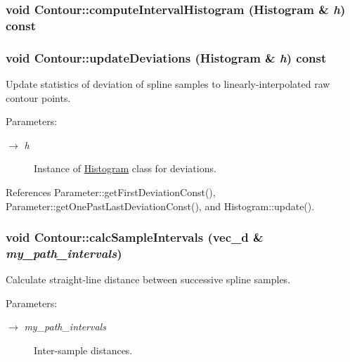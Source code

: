 \hypertarget{classContour_b6aef0a09131e1ed47a64378373a4571}{
\subsubsection[computeIntervalHistogram]{\setlength{\rightskip}{0pt plus 5cm}void Contour::computeIntervalHistogram ({\bf Histogram} \& {\em h}) const}}
\label{classContour_b6aef0a09131e1ed47a64378373a4571}


\hypertarget{classContour_bfbd206df1ad7a511a0144ae866d2432}{
\subsubsection[updateDeviations]{\setlength{\rightskip}{0pt plus 5cm}void Contour::updateDeviations ({\bf Histogram} \& {\em h}) const}}
\label{classContour_bfbd206df1ad7a511a0144ae866d2432}


Update statistics of deviation of spline samples to linearly-interpolated raw contour points. \begin{Desc}
\item[Parameters:]
\begin{description}
\item[\mbox{$\rightarrow$} {\em h}]Instance of \hyperlink{classHistogram}{Histogram} class for deviations. \end{description}
\end{Desc}


References Parameter::getFirstDeviationConst(), Parameter::getOnePastLastDeviationConst(), and Histogram::update().\hypertarget{classContour_331624a8a963efe4b50d58d94010fbd3}{
\subsubsection[calcSampleIntervals]{\setlength{\rightskip}{0pt plus 5cm}void Contour::calcSampleIntervals ({\bf vec\_\-d} \& {\em my\_\-path\_\-intervals})}}
\label{classContour_331624a8a963efe4b50d58d94010fbd3}


Calculate straight-line distance between successive spline samples. \begin{Desc}
\item[Parameters:]
\begin{description}
\item[\mbox{$\rightarrow$} {\em my\_\-path\_\-intervals}]Inter-sample distances. \end{description}
\end{Desc}


